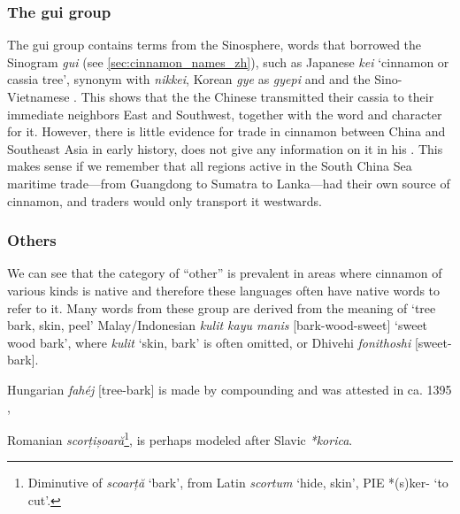 \subsubsection{The gui group}

The gui group contains terms from the Sinosphere, words that borrowed the Sinogram  \textit{gui} (see \cref{sec:cinnamon_names_zh}), such as Japanese  \textit{kei} `cinnamon or cassia tree', synonym with  \textit{nikkei}, Korean  \textit{gye} as  \textit{gyepi} and  and the Sino-Vietnamese . This shows that the the Chinese transmitted their cassia to their immediate neighbors East and Southwest, together with the word and character for it. However, there is little evidence for trade in cinnamon between China and Southeast Asia in early history, \textcite{wang_nanhai_1958} does not give any information on it in his . \autocite{wang_nanhai_1958} This makes sense if we remember that all regions active in the South China Sea maritime trade---from Guangdong to Sumatra to Lanka---had their own source of cinnamon, and traders would only transport it westwards.

\subsubsection{Others}

We can see that the category of ``other'' is prevalent in areas where cinnamon of various kinds is native and therefore these languages often have native words to refer to it. Many words from these group are derived from the meaning of `tree bark, skin, peel' Malay/Indonesian \textit{kulit kayu manis} [bark-wood-sweet] `sweet wood bark', where \textit{kulit} `skin, bark' is often omitted, or Dhivehi \textit{fonithoshi} [sweet-bark]. 

Hungarian \textit{fahéj} [tree-bark] is made by compounding and was attested in ca. 1395 \autocite[fahéj]{zaicz_etimologiai_2006},

Romanian \textit{scorțișoară}\footnote{Diminutive of \textit{scoarță} `bark', from Latin \textit{scortum} `hide, skin', PIE *(s)ker- `to cut'.}, is perhaps modeled after Slavic \textit{*korica}.







